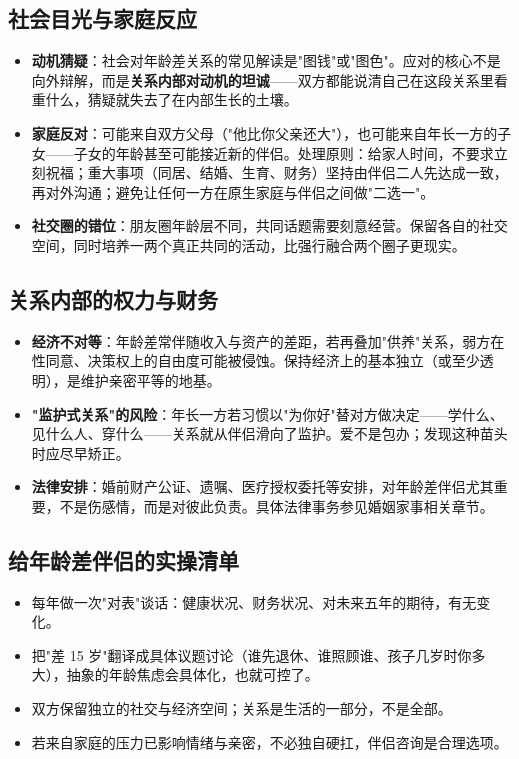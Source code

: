 \subsection{社会目光与家庭反应}

\begin{itemize}
\item \textbf{动机猜疑}：社会对年龄差关系的常见解读是"图钱"或"图色"。应对的核心不是向外辩解，而是\textbf{关系内部对动机的坦诚}——双方都能说清自己在这段关系里看重什么，猜疑就失去了在内部生长的土壤。
\item \textbf{家庭反对}：可能来自双方父母（"他比你父亲还大"），也可能来自年长一方的子女——子女的年龄甚至可能接近新的伴侣。处理原则：给家人时间，不要求立刻祝福；重大事项（同居、结婚、生育、财务）坚持由伴侣二人先达成一致，再对外沟通；避免让任何一方在原生家庭与伴侣之间做"二选一"。
\item \textbf{社交圈的错位}：朋友圈年龄层不同，共同话题需要刻意经营。保留各自的社交空间，同时培养一两个真正共同的活动，比强行融合两个圈子更现实。
\end{itemize}

\subsection{关系内部的权力与财务}

\begin{itemize}
\item \textbf{经济不对等}：年龄差常伴随收入与资产的差距，若再叠加"供养"关系，弱方在性同意、决策权上的自由度可能被侵蚀。保持经济上的基本独立（或至少透明），是维护亲密平等的地基。
\item \textbf{"监护式关系"的风险}：年长一方若习惯以"为你好"替对方做决定——学什么、见什么人、穿什么——关系就从伴侣滑向了监护。爱不是包办；发现这种苗头时应尽早矫正。
\item \textbf{法律安排}：婚前财产公证、遗嘱、医疗授权委托等安排，对年龄差伴侣尤其重要，不是伤感情，而是对彼此负责。具体法律事务参见婚姻家事相关章节。
\end{itemize}

\subsection{给年龄差伴侣的实操清单}

\begin{itemize}
\item 每年做一次"对表"谈话：健康状况、财务状况、对未来五年的期待，有无变化。
\item 把"差 15 岁"翻译成具体议题讨论（谁先退休、谁照顾谁、孩子几岁时你多大），抽象的年龄焦虑会具体化，也就可控了。
\item 双方保留独立的社交与经济空间；关系是生活的一部分，不是全部。
\item 若来自家庭的压力已影响情绪与亲密，不必独自硬扛，伴侣咨询是合理选项。
\end{itemize}

